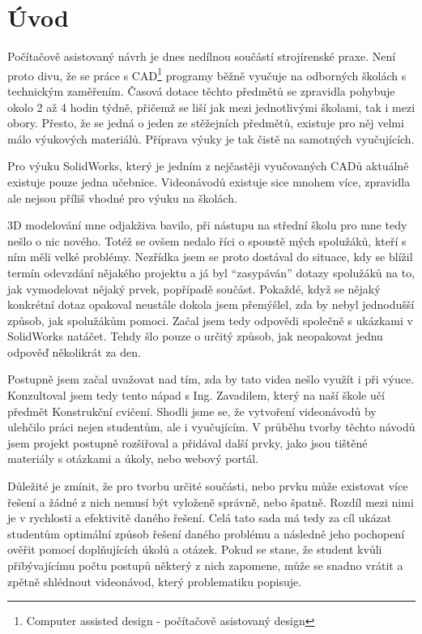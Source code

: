 \chapter*{Úvod}
Počítačově asistovaný návrh je dnes nedílnou součástí strojírenské praxe.
Není proto divu, že se práce s CAD\footnote{Computer assisted design - počítačově asistovaný design} programy běžně vyučuje na odborných školách s technickým zaměřením.
Časová dotace těchto předmětů se zpravidla pohybuje okolo 2 až 4 hodin týdně, přičemž se liší jak mezi jednotlivými školami, tak i mezi obory.
Přesto, že se jedná o jeden ze stěžejních předmětů, existuje pro něj velmi málo výukových materiálů.
Příprava výuky je tak čistě na samotných vyučujících.

Pro výuku SolidWorks, který je jedním z nejčastěji vyučovaných CADů aktuálně existuje pouze jedna učebnice.
Videonávodů existuje sice mnohem více, zpravidla ale nejsou příliš vhodné pro výuku na školách.

3D modelování mne odjakživa bavilo, při nástupu na střední školu pro mne tedy nešlo o nic nového.
Totéž se ovšem nedalo říci o spoustě mých spolužáků, kteří s ním měli velké problémy.
Nezřídka jsem se proto dostával do situace, kdy se blížil termín odevzdání nějakého projektu a já byl \enquote{zasypáván} dotazy spolužáků na to, jak vymodelovat nějaký prvek, popřípadě součást.
Pokaždé, když se nějaký konkrétní dotaz opakoval neustále dokola jsem přemýšlel, zda by nebyl jednodušší způsob, jak spolužákům pomoci.
Začal jsem tedy odpovědi společně s ukázkami v SolidWorks natáčet.
Tehdy šlo pouze o určitý způsob, jak neopakovat jednu odpověď několikrát za den.

Postupně jsem začal uvažovat nad tím, zda by tato videa nešlo využít i při výuce.
Konzultoval jsem tedy tento nápad s Ing. Zavadilem, který na naší škole učí předmět Konstrukční cvičení.
Shodli jsme se, že vytvoření videonávodů by ulehčilo práci nejen studentům, ale i vyučujícím.
V průběhu tvorby těchto návodů jsem projekt postupně rozšiřoval a přidával další prvky, jako jsou tištěné materiály s otázkami a úkoly, nebo webový portál.

Důležité je zmínit, že pro tvorbu určité součásti, nebo prvku může existovat více řešení a žádné z nich nemusí být vyloženě správně, nebo špatně.
Rozdíl mezi nimi je v rychlosti a efektivitě daného řešení.
Celá tato sada má tedy za cíl ukázat studentům optimální způsob řešení daného problému a následně jeho pochopení ověřit pomocí doplňujících úkolů a otázek.
Pokud se stane, že student kvůli přibývajícímu počtu postupů některý z nich zapomene, může se snadno vrátit a zpětně shlédnout videonávod, který problematiku popisuje.

\newpage
